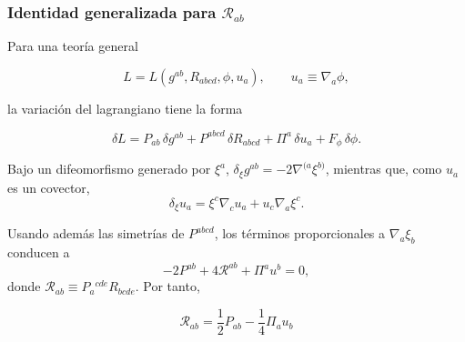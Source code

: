 \documentclass{beamer}
\newcommand{\Rcal}{\mathcal{R}}
\begin{document}
\begin{frame}[label=nav-frame-076]
	\frametitle{Identidad generalizada para \(\Rcal_{ab}\)}
	\small

	Para una teoría general

	\[
	L=L(g^{ab},R_{abcd},\phi,u_a),
	\qquad
	u_a\equiv\nabla_a\phi,
	\]

	la variación del lagrangiano tiene la forma

	\[
	\delta L
	=
	P_{ab}\,\delta g^{ab}
	+
	P^{abcd}\,\delta R_{abcd}
	+
	\Pi^a\,\delta u_a
	+
	F_\phi\,\delta\phi.
	\]


	Bajo un difeomorfismo generado por \(\xi^a\), $\delta_\xi g^{ab} = -2\nabla^{(a}\xi^{b)}$, mientras que, como \(u_a\) es un covector,
	\[
	\delta_\xi u_a
	=
	\xi^c\nabla_cu_a
	+
	u_c\nabla_a\xi^c.
	\]


	Usando además las simetrías de \(P^{abcd}\), los términos
	proporcionales a \(\nabla_a\xi_b\) conducen a
	\[
	-2P^{ab}
	+
	4\Rcal^{ab}
	+
	\Pi^a u^b
	=
	0,
	\]
	donde $\Rcal_{ab} \equiv P_a{}^{cde}R_{bcde}$. Por tanto,

	\begin{equation}
		\boxed{
			\Rcal_{ab} = \frac12 P_{ab} - \frac14 \Pi_a u_b
		}
		\label{eq:identidad-Rcal-general}
	\end{equation}

\end{frame}
\end{document}
